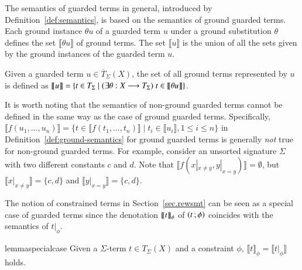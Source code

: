 The semantics of guarded terms in general, introduced by
Definition~\ref{def:semantics}, is based on the semantics of ground
guarded terms.  Each ground instance $\theta u$ of a guarded term $u$
under a ground substitution $\theta$ defines the set $\llbracket
\theta u \rrbracket$ of ground terms.  The set $\llbracket u
\rrbracket$ is the union of all the sets given by the ground instances
of the guarded term $u$.

\begin{definition}\label{def:semantics}
Given a guarded term $u \in \overline{T}_{\Sigma}(X)$, the set of all
ground terms represented by $u$ is defined as $\llbracket u \rrbracket
= \{t \in T_\Sigma \mid (\exists \theta : X \longrightarrow T_\Sigma)\; t \in
\llbracket \theta u \rrbracket \}$.
\end{definition}


It is worth noting that the semantics of non-ground guarded terms
cannot be defined in the same way as the case of ground guarded terms.
Specifically, $\llbracket f(u_1,\ldots,u_n) \rrbracket = \{t \in
\llbracket f(t_1,\ldots,t_n)\rrbracket \mid t_i \in \llbracket
u_i\rrbracket, 1 \leq i \leq n \}$ in
Definition~\ref{def:ground-semantics} for ground guarded terms is
generally \emph{not} true for non-ground guarded terms.
%
For example, consider an unsorted signature $\Sigma$ with two
different constants $c$ and $d$.  Note that $\llbracket f(x |_{x \neq
  y}, y |_{x = y})\rrbracket = \emptyset$, but $\llbracket x |_{x \neq
  y} \rrbracket = \{c,d\}$ and $\llbracket y |_{x = y} \rrbracket =
\{c, d\}$.

The notion of constrained terms in Section~\ref{sec.rewsmt} can be
seen as a special case of guarded terms since the denotation
$\llbracket t \rrbracket_{\phi}$ of $\left( t \,; \phi \right)$ coincides with the semantics of
$t |_\phi$.

\begin{restatable}{lemma}{specialcase}
Given a $\Sigma$-term $t \in T_\Sigma(X)$ and a constraint $\phi$,
$\llbracket t \rrbracket_\phi = \llbracket t |_\phi \rrbracket$ holds.
\end{restatable}



